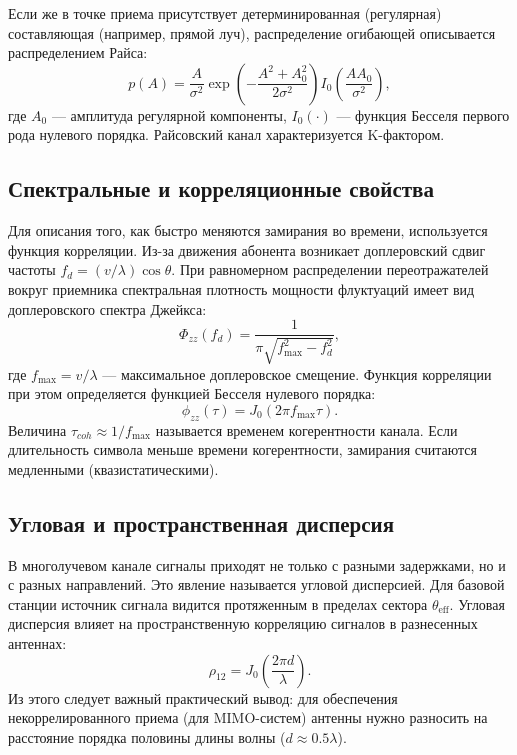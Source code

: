 Если же в точке приема присутствует детерминированная (регулярная) составляющая (например, прямой луч), распределение огибающей описывается распределением Райса:
\begin{equation}
    p(A) = \frac{A}{\sigma^2} \exp\left(-\frac{A^2 + A_0^2}{2\sigma^2}\right) I_0\left(\frac{A A_0}{\sigma^2}\right),
\end{equation}
где $A_0$ --- амплитуда регулярной компоненты, $I_0(\cdot)$ --- функция Бесселя первого рода нулевого порядка. Райсовский канал характеризуется K-фактором.

\subsection{Спектральные и корреляционные свойства}

Для описания того, как быстро меняются замирания во времени, используется функция корреляции. Из-за движения абонента возникает доплеровский сдвиг частоты $f_d = (v/\lambda)\cos\theta$. При равномерном распределении переотражателей вокруг приемника спектральная плотность мощности флуктуаций имеет вид доплеровского спектра Джейкса:
\begin{equation}
    \Phi_{zz}(f_d) = \frac{1}{\pi \sqrt{f_{\max}^2 - f_d^2}},
\end{equation}
где $f_{\max} = v/\lambda$ --- максимальное доплеровское смещение. Функция корреляции при этом определяется функцией Бесселя нулевого порядка:
\begin{equation}
    \phi_{zz}(\tau) = J_0(2\pi f_{\max} \tau).
\end{equation}
Величина $\tau_{coh} \approx 1/f_{\max}$ называется временем когерентности канала. Если длительность символа меньше времени когерентности, замирания считаются медленными (квазистатическими).

\subsection{Угловая и пространственная дисперсия}

В многолучевом канале сигналы приходят не только с разными задержками, но и с разных направлений. Это явление называется угловой дисперсией. Для базовой станции источник сигнала видится протяженным в пределах сектора $\theta_{\text{eff}}$. Угловая дисперсия влияет на пространственную корреляцию сигналов в разнесенных антеннах:
\begin{equation}
    \rho_{12} = J_0\left(\frac{2\pi d}{\lambda}\right).
\end{equation}
Из этого следует важный практический вывод: для обеспечения некоррелированного приема (для MIMO-систем) антенны нужно разносить на расстояние порядка половины длины волны ($d \approx 0.5\lambda$).

